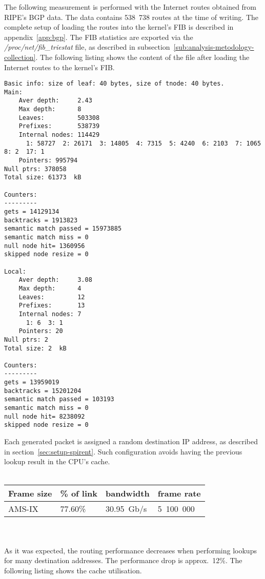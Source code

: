 
The following measurement is performed with the Internet routes obtained from RIPE's BGP data.
The data contains 538~738 routes at the time of writing.
The complete setup of loading the routes into the kernel's FIB is described in appendix~\ref{app:bgp}.
The FIB statistics are exported via the {\it{/proc/net/fib\_triestat}} file, as described in
subsection~\ref{sub:analysis-metodology-collection}.
The following listing shows the content of the file after loading the Internet routes to the kernel's FIB.
\begin{lstlisting}
Basic info: size of leaf: 40 bytes, size of tnode: 40 bytes.
Main:
	Aver depth:     2.43
	Max depth:      8
	Leaves:         503308
	Prefixes:       538739
	Internal nodes: 114429
	  1: 58727  2: 26171  3: 14805  4: 7315  5: 4240  6: 2103  7: 1065  8: 2  17: 1
	Pointers: 995794
Null ptrs: 378058
Total size: 61373  kB

Counters:
---------
gets = 14129134
backtracks = 1913823
semantic match passed = 15973885
semantic match miss = 0
null node hit= 1360956
skipped node resize = 0

Local:
	Aver depth:     3.08
	Max depth:      4
	Leaves:         12
	Prefixes:       13
	Internal nodes: 7
	  1: 6  3: 1
	Pointers: 20
Null ptrs: 2
Total size: 2  kB

Counters:
---------
gets = 13959019
backtracks = 15201204
semantic match passed = 103193
semantic match miss = 0
null node hit= 8238092
skipped node resize = 0
\end{lstlisting}
Each generated packet is assigned a random destination IP address, as described in section~\ref{sec:setup-spirent}.
Such configuration avoids having the previous lookup result in the CPU's cache.
\\
\\
\begin{tabular}{ | l | l | l | l | }
\hline
Frame size & \% of link & bandwidth & frame rate \\
\hline
AMS-IX & 77.60\% &  30.95~Gb/s & 5~100~000 \\
\hline
\end{tabular}
\\
\\
As it was expected, the routing performance decreases when performing lookups for many destination addresses.
The performance drop is approx.~12\%.
The following listing shows the cache utilisation.
